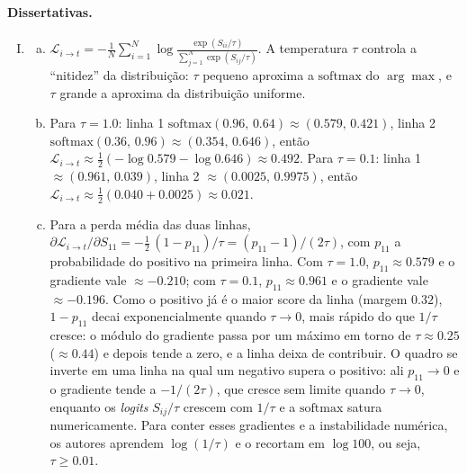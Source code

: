\documentclass{dlproblemset}
\begin{document}
\paragraph{Dissertativas.}
\begin{enumerate}[I)]
    \item
    \begin{enumerate}[(a)]
        \item $\mathcal{L}_{i \to t} = -\tfrac{1}{N}\sum_{i=1}^{N} \log\frac{\exp(S_{ii}/\tau)}{\sum_{j=1}^{N} \exp(S_{ij}/\tau)}$. A temperatura $\tau$ controla a ``nitidez'' da distribuição: $\tau$ pequeno aproxima a $\mathrm{softmax}$ do $\arg\max$, e $\tau$ grande a aproxima da distribuição uniforme.
        \item Para $\tau = 1.0$: linha 1 $\mathrm{softmax}(0.96,\, 0.64) \approx (0.579,\, 0.421)$, linha 2 $\mathrm{softmax}(0.36,\, 0.96) \approx (0.354,\, 0.646)$, então $\mathcal{L}_{i \to t} \approx \tfrac{1}{2}(-\log 0.579 - \log 0.646) \approx 0.492$. Para $\tau = 0.1$: linha 1 $\approx (0.961,\, 0.039)$, linha 2 $\approx (0.0025,\, 0.9975)$, então $\mathcal{L}_{i \to t} \approx \tfrac{1}{2}(0.040 + 0.0025) \approx 0.021$.
        \item Para a perda média das duas linhas, $\partial \mathcal{L}_{i \to t}/\partial S_{11} = -\tfrac{1}{2}\,(1 - p_{11})/\tau = (p_{11} - 1)/(2\tau)$, com $p_{11}$ a probabilidade do positivo na primeira linha. Com $\tau = 1.0$, $p_{11} \approx 0.579$ e o gradiente vale $\approx -0.210$; com $\tau = 0.1$, $p_{11} \approx 0.961$ e o gradiente vale $\approx -0.196$. Como o positivo já é o maior score da linha (margem $0.32$), $1 - p_{11}$ decai exponencialmente quando $\tau \to 0$, mais rápido do que $1/\tau$ cresce: o módulo do gradiente passa por um máximo em torno de $\tau \approx 0.25$ ($\approx 0.44$) e depois tende a zero, e a linha deixa de contribuir. O quadro se inverte em uma linha na qual um negativo supera o positivo: ali $p_{11} \to 0$ e o gradiente tende a $-1/(2\tau)$, que cresce sem limite quando $\tau \to 0$, enquanto os \textit{logits} $S_{ij}/\tau$ crescem com $1/\tau$ e a $\mathrm{softmax}$ satura numericamente. Para conter esses gradientes e a instabilidade numérica, os autores aprendem $\log(1/\tau)$ e o recortam em $\log 100$, ou seja, $\tau \geq 0.01$.
    \end{enumerate}


\end{enumerate}
\end{document}
